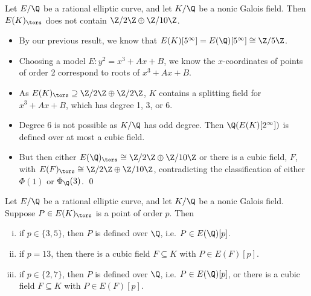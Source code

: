 \begin{frame}[plain,c]
\footnotesize
\begin{lem}[M.]
Let $E/\Q$ be a rational elliptic curve, and let $K/\Q$ be a nonic Galois field. Then $E(K)_\tors$ does not contain $\Z/2\Z \oplus \Z/10\Z$.
\end{lem} \pspace

\pfsk
\begin{itemize}
\item By our previous result, we know that $E(K)[5^\infty]= E(\Q)[5^\infty] \cong \Z/5\Z$. 
\item Choosing a model $E: y^2= x^3 + Ax + B$, we know the $x$-coordinates of points of order 2 correspond to roots of $x^3 + Ax + B$. 
\item As $E(K)_\tors \supseteq \Z/2\Z \oplus \Z/2\Z$, $K$ contains a splitting field for $x^3 + Ax + B$, which has degree 1, 3, or 6. 
\item Degree 6 is not possible as $K/\Q$ has odd degree. Then $\Q(E(K)[2^\infty])$ is defined over at most a cubic field. 
\item But then either $E(\Q)_\tors \cong \Z/2\Z \oplus \Z/10\Z$ or there is a cubic field, $F$, with $E(F)_\tors \cong \Z/2\Z \oplus \Z/10\Z$, contradicting the classification of either $\Phi(1)$ or $\Phi_\Q(3)$. \hfill\qed
\end{itemize}
\end{frame}





\begin{frame}[plain,c]
\begin{lem}[M.]
Let $E/\Q$ be a rational elliptic curve, and let $K/\Q$ be a nonic Galois field. Suppose $P \in E(K)_\tors$ is a point of order $p$. Then
        \begin{enumerate}[(i)]
        \item if $p \in \{ 3, 5 \}$, then $P$ is defined over $\Q$, i.e. $P \in E(\Q)[p]$.
        \item if $p= 13$, then there is a cubic field $F \subseteq K$ with $P \in E(F)[p]$. 
        \item if $p \in \{ 2, 7 \}$, then $P$ is defined over $\Q$, i.e. $P \in E(\Q)[p]$, or there is a cubic field $F \subseteq K$ with $P \in E(F)[p]$. 
        \end{enumerate}
\end{lem}
\end{frame}





